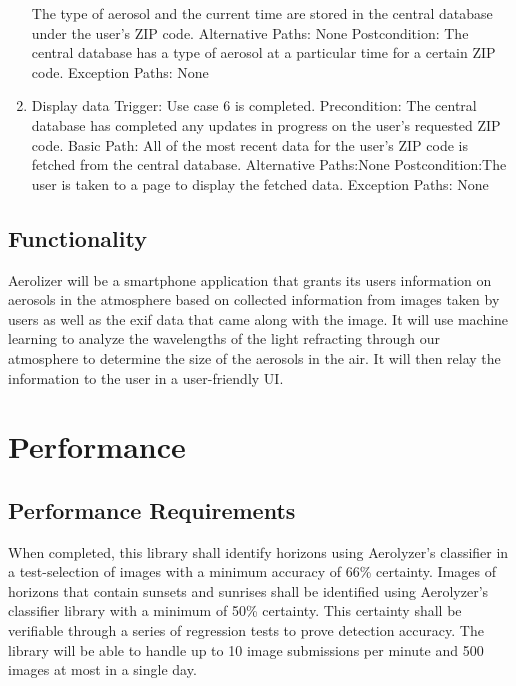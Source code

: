 \documentclass[journal,10pt,draftclsnofoot,onecolumn]{IEEEtran}
\begin{document}
\begin{singlespace}
\begin{enumerate}
The type of aerosol and the current time are stored in the central database under the user's ZIP code.
Alternative Paths: None
Postcondition: The central database has a type of aerosol at a particular time for a certain ZIP code.
Exception Paths: None
\\
\item Display data
Trigger: Use case 6 is completed.
Precondition: The central database has completed any updates in progress on the user's requested ZIP code.
Basic Path: 
All of the most recent data for the user's ZIP code is fetched from the central database.
Alternative Paths:None
Postcondition:The user is taken to a page to display the fetched data.
Exception Paths: None
\end{enumerate}

\subsection{Functionality}
Aerolizer will be a smartphone application that grants its users information on aerosols in the atmosphere based on collected information from images taken by users as well as the exif data that came along with the image. It will use machine learning to analyze the wavelengths of the light refracting through our atmosphere to determine the size of the aerosols in the air. It will then relay the information to the user in a user-friendly UI. 

\section{Performance}
\subsection{Performance Requirements}
When completed, this library shall identify horizons using Aerolyzer's classifier in a test-selection of images with a minimum accuracy of 66\% certainty. Images of horizons that contain sunsets and sunrises shall be identified using Aerolyzer's classifier library with a minimum of 50\% certainty. This certainty shall be verifiable through a series of regression tests to prove detection accuracy.
The library will be able to handle up to 10 image submissions per minute and 500 images at most in a single day.


\nocite{*}




\end{singlespace}
\end{document}

